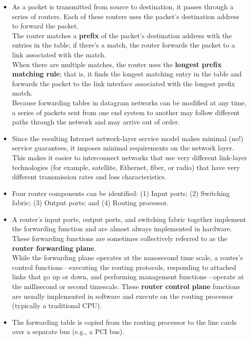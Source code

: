 \begin{itemize}
\item
As a packet is transmitted from source to destination, it passes through a series of routers. Each of these routers uses the packet's destination address to forward the packet.\\
The router matches a \textbf{prefix} of the packet's destination address with the entries in the table; if there's a match, the router forwards the packet to a link associated with the match.\\
When there are multiple matches, the router uses the \textbf{longest prefix matching rule}; that is, it finds the longest matching entry in the table and forwards the packet to the link interface associated with the longest prefix match.\\
Because forwarding tables in datagram networks can be modified at any time, a series of packets sent from one end system to another may follow different paths through the network and may arrive out of order.

\item
Since the resulting Internet network-layer service model makes minimal (no!) service guarantees, it imposes minimal requirements on the network layer. This makes it easier to interconnect networks that use very different link-layer technologies (for example, satellite, Ethernet, fiber, or radio) that have very different transmission rates and loss characteristics.

\item
Four router components can be identified: (1) Input ports; (2) Switching fabric; (3) Output ports; and (4) Routing processor.

\item
A router's input ports, output ports, and switching fabric together implement the forwarding function and are almost always implemented in hardware. These forwarding functions are sometimes collectively referred to as the \textbf{router forwarding plane}.\\
While the forwarding plane operates at the nanosecond time scale, a router's control functions---executing the routing protocols, responding to attached links that go up or down, and performing management functions---operate at the millisecond or second timescale. These \textbf{router control plane} functions are usually implemented in software and execute on the routing processor (typically a traditional CPU).

\item
The forwarding table is copied from the routing processor to the line cards over a separate bus (e.g., a PCI bus).


\end{itemize}
